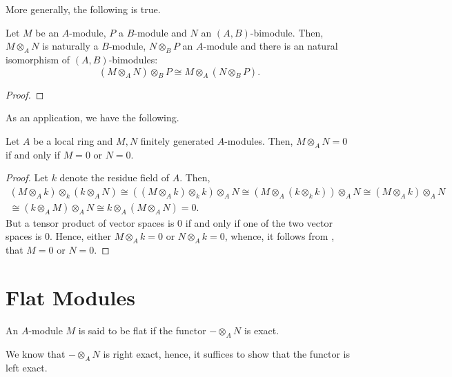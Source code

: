More generally, the following is true. 

\begin{theorem}
    Let $M$ be an $A$-module, $P$ a $B$-module and $N$ an $(A, B)$-bimodule. Then, $M\otimes_A N$ is naturally a $B$-module, $N\otimes_B P$ an $A$-module and there is an natural isomorphism of $(A,B)$-bimodules: 
    \begin{equation*}
        (M\otimes_A N)\otimes_B P\cong M\otimes_A (N\otimes_B P).
    \end{equation*}
\end{theorem}
\begin{proof}
    
\end{proof}

As an application, we have the following.
\begin{proposition}
    Let $A$ be a local ring and $M, N$ finitely generated $A$-modules. Then, $M\otimes_A N = 0$ if and only if $M = 0$ or $N = 0$.
\end{proposition}
\begin{proof}
    Let $k$ denote the residue field of $A$. Then, 
    \begin{gather*}
        (M\otimes_A k)\otimes_k(k\otimes_A N)\cong((M\otimes_A k)\otimes_k k)\otimes_A N\cong (M\otimes_A(k\otimes_k k))\otimes_A N\cong(M\otimes_A k)\otimes_A N\\
        \cong (k\otimes_A M)\otimes_A N\cong k\otimes_A(M\otimes_A N) = 0.
    \end{gather*}
    But a tensor product of vector spaces is $0$ if and only if one of the two vector spaces is $0$. Hence, either $M\otimes_A k = 0$ or $N\otimes_A k = 0$, whence, it follows from , that $M = 0$ or $N = 0$.
\end{proof}

\section{Flat Modules}

\begin{definition}
    An $A$-module $M$ is said to be flat if the functor $-\otimes_A N$ is exact.
\end{definition}

We know that $-\otimes_AN$ is right exact, hence, it suffices to show that the functor is left exact.

